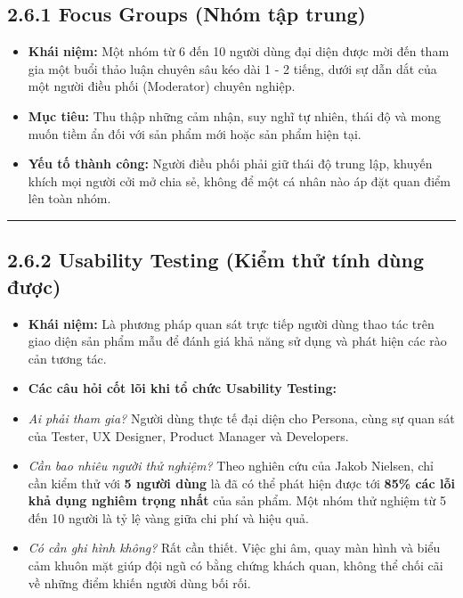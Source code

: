 \documentclass[11pt,a4paper,oneside]{report}
\begin{document}
\subsection{2.6.1 Focus Groups (Nhóm tập trung)}
\begin{itemize}[leftmargin=1.5em]
\item \textbf{Khái niệm:} Một nhóm từ 6 đến 10 người dùng đại diện được mời đến tham gia một buổi thảo luận chuyên sâu kéo dài 1 - 2 tiếng, dưới sự dẫn dắt của một người điều phối (Moderator) chuyên nghiệp.
\item \textbf{Mục tiêu:} Thu thập những cảm nhận, suy nghĩ tự nhiên, thái độ và mong muốn tiềm ẩn đối với sản phẩm mới hoặc sản phẩm hiện tại.
\item \textbf{Yếu tố thành công:} Người điều phối phải giữ thái độ trung lập, khuyến khích mọi người cởi mở chia sẻ, không để một cá nhân nào áp đặt quan điểm lên toàn nhóm.
\end{itemize}

\bigskip\hrule\bigskip

\subsection{2.6.2 Usability Testing (Kiểm thử tính dùng được)}
\begin{itemize}[leftmargin=1.5em]
\item \textbf{Khái niệm:} Là phương pháp quan sát trực tiếp người dùng thao tác trên giao diện sản phẩm mẫu để đánh giá khả năng sử dụng và phát hiện các rào cản tương tác.
\item \textbf{Các câu hỏi cốt lõi khi tổ chức Usability Testing:}
\item \textit{Ai phải tham gia?} Người dùng thực tế đại diện cho Persona, cùng sự quan sát của Tester, UX Designer, Product Manager và Developers.
\item \textit{Cần bao nhiêu người thử nghiệm?} Theo nghiên cứu của Jakob Nielsen, chỉ cần kiểm thử với \textbf{5 người dùng} là đã có thể phát hiện được tới \textbf{85\% các lỗi khả dụng nghiêm trọng nhất} của sản phẩm. Một nhóm thử nghiệm từ 5 đến 10 người là tỷ lệ vàng giữa chi phí và hiệu quả.
\item \textit{Có cần ghi hình không?} Rất cần thiết. Việc ghi âm, quay màn hình và biểu cảm khuôn mặt giúp đội ngũ có bằng chứng khách quan, không thể chối cãi về những điểm khiến người dùng bối rối.
\end{itemize}
\end{document}
